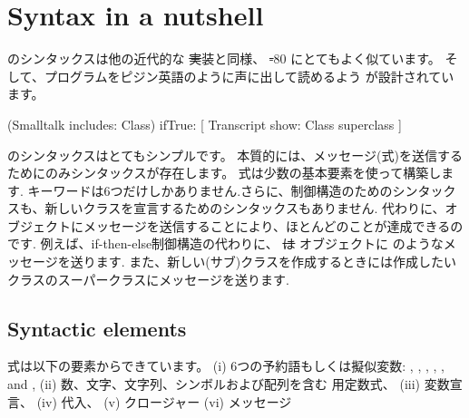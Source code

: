 \documentclass[a4paper,10pt,twoside]{book}
\begin{document}
	\renewcommand{\nnbb}[2]{} %
	\sloppy
\fi
\chapter{Syntax in a nutshell}



\pharo のシンタックスは他の近代的な \st 実装と同様、 \st-80 にとてもよく似ています。
そして、プログラムをピジン英語のように声に出して読めるよう  が設計されています。

\begin{code}{}
(Smalltalk includes: Class) ifTrue: [ Transcript show: Class superclass ]
\end{code}

\noindent
\pharo のシンタックスはとてもシンプルです。
本質的には、メッセージ(\ie 式)を送信するためにのみシンタックスが存在します。
式は少数の基本要素を使って構築します.
キーワードは6つだけしかありません.さらに、制御構造のためのシンタックスも、新しいクラスを宣言するためのシンタックスもありません.
代わりに、オブジェクトにメッセージを送信することにより、ほとんどのことが達成できるのです.
例えば、if-then-else制御構造の代わりに、 \st は  オブジェクトに  のようなメッセージを送ります.
また、新しい(サブ)クラスを作成するときには作成したいクラスのスーパークラスにメッセージを送ります.

\section{Syntactic elements}

式は以下の要素からできています。
(i) 6つの予約語もしくは擬似変数:
, , , , , and ,
(ii) 数、文字、文字列、シンボルおよび配列を含む 用定数式、
(iii) 変数宣言、
(iv) 代入、
(v)  クロージャー
(vi) メッセージ
\end{document}
